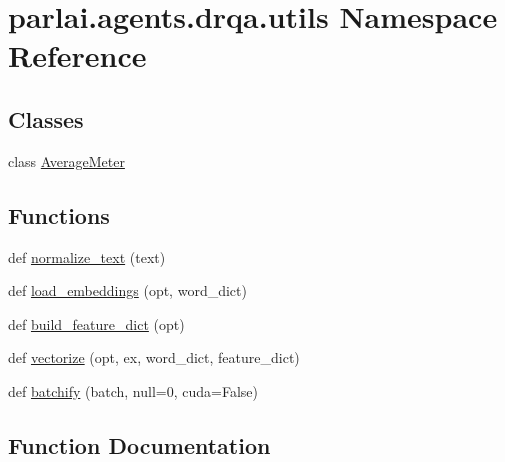 \hypertarget{namespaceparlai_1_1agents_1_1drqa_1_1utils}{}\section{parlai.\+agents.\+drqa.\+utils Namespace Reference}
\label{namespaceparlai_1_1agents_1_1drqa_1_1utils}
\subsection*{Classes}
\begin{DoxyCompactItemize}
\item 
class \hyperlink{classparlai_1_1agents_1_1drqa_1_1utils_1_1AverageMeter}{Average\+Meter}
\end{DoxyCompactItemize}
\subsection*{Functions}
\begin{DoxyCompactItemize}
\item 
def \hyperlink{namespaceparlai_1_1agents_1_1drqa_1_1utils_a125ab4e64306060e9ecaa3999f7be6b6}{normalize\+\_\+text} (text)
\item 
def \hyperlink{namespaceparlai_1_1agents_1_1drqa_1_1utils_aa92d9906125210574825a20c75c199c8}{load\+\_\+embeddings} (opt, word\+\_\+dict)
\item 
def \hyperlink{namespaceparlai_1_1agents_1_1drqa_1_1utils_a14201349d4a16b48aa7929cfdbf10ebd}{build\+\_\+feature\+\_\+dict} (opt)
\item 
def \hyperlink{namespaceparlai_1_1agents_1_1drqa_1_1utils_a5c76cc39e3014c7bcf9199d566dbdc0f}{vectorize} (opt, ex, word\+\_\+dict, feature\+\_\+dict)
\item 
def \hyperlink{namespaceparlai_1_1agents_1_1drqa_1_1utils_aca22dd97c5b6dcda2a7479c1cb22ef1e}{batchify} (batch, null=0, cuda=False)
\end{DoxyCompactItemize}


\subsection{Function Documentation}
\mbox{\label{namespaceparlai_1_1agents_1_1drqa_1_1utils_aca22dd97c5b6dcda2a7479c1cb22ef1e}} 
